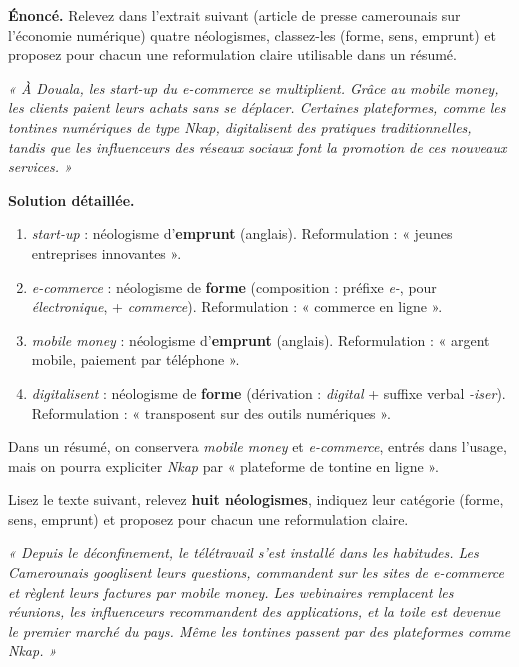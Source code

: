 \documentclass[11pt]{article}
\begin{document}
\begin{exoresolu}
\textbf{Énoncé.} Relevez dans l'extrait suivant (article de presse camerounais sur l'économie numérique) quatre néologismes, classez-les (forme, sens, emprunt) et proposez pour chacun une reformulation claire utilisable dans un résumé.

\emph{« À Douala, les start-up du e-commerce se multiplient. Grâce au mobile money, les clients paient leurs achats sans se déplacer. Certaines plateformes, comme les tontines numériques de type Nkap, digitalisent des pratiques traditionnelles, tandis que les influenceurs des réseaux sociaux font la promotion de ces nouveaux services. »}

\tcblower
\textbf{Solution détaillée.}
\begin{enumerate}
\item \emph{start-up} : néologisme d'\textbf{emprunt} (anglais). Reformulation : « jeunes entreprises innovantes ».
\item \emph{e-commerce} : néologisme de \textbf{forme} (composition : préfixe \emph{e-}, pour \emph{électronique}, + \emph{commerce}). Reformulation : « commerce en ligne ».
\item \emph{mobile money} : néologisme d'\textbf{emprunt} (anglais). Reformulation : « argent mobile, paiement par téléphone ».
\item \emph{digitalisent} : néologisme de \textbf{forme} (dérivation : \emph{digital} + suffixe verbal \emph{-iser}). Reformulation : « transposent sur des outils numériques ».
\end{enumerate}
Dans un résumé, on conservera \emph{mobile money} et \emph{e-commerce}, entrés dans l'usage, mais on pourra expliciter \emph{Nkap} par « plateforme de tontine en ligne ».
\end{exoresolu}

\begin{exercice}
Lisez le texte suivant, relevez \textbf{huit néologismes}, indiquez leur catégorie (forme, sens, emprunt) et proposez pour chacun une reformulation claire.

\emph{« Depuis le déconfinement, le télétravail s'est installé dans les habitudes. Les Camerounais googlisent leurs questions, commandent sur les sites de e-commerce et règlent leurs factures par mobile money. Les webinaires remplacent les réunions, les influenceurs recommandent des applications, et la toile est devenue le premier marché du pays. Même les tontines passent par des plateformes comme Nkap. »}
\end{exercice}
\end{document}
